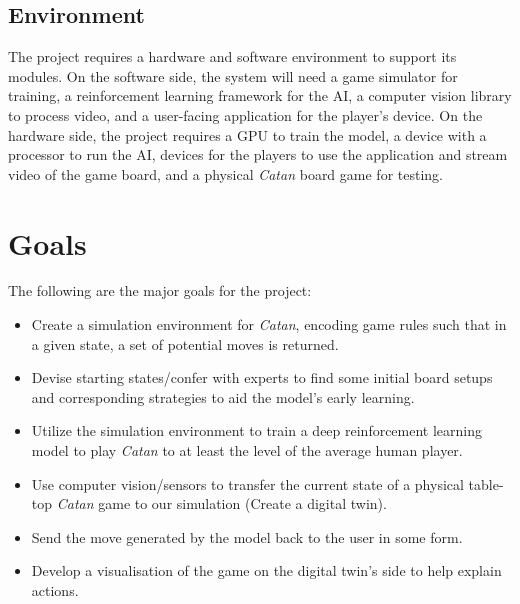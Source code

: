 \documentclass{article}
\begin{document}
\subsection{Environment}
The project requires a hardware and software environment to support its modules. On the software side, the system will need a game simulator for training, a reinforcement learning framework for the AI, a computer vision library to process video, and a user-facing application for the player's device. On the hardware side, the project requires a GPU to train the model, a device with a processor to run the AI, devices for the players to use the application and stream video of the game board, and a physical \emph{Catan} board game for testing.

\section{Goals}\label{sec:goals}
The following are the major goals for the project:
\begin{itemize}
    \item Create a simulation environment for \emph{Catan}, encoding game rules such that in a given state, a set of potential moves is returned.
    \item Devise starting states/confer with experts to find some initial board setups and corresponding strategies to aid the model’s early learning.
    \item Utilize the simulation environment to train a deep reinforcement learning model to play \emph{Catan} to at least the level of the average human player.
    \item Use computer vision/sensors to transfer the current state of a physical table-top \emph{Catan} game to our simulation (Create a digital twin).
    \item Send the move generated by the model back to the user in some form.
    \item Develop a visualisation of the game on the digital twin’s side to help explain actions.
\end{itemize}
\end{document}
